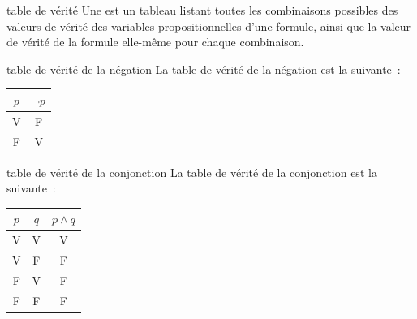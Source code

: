 
\begin{definition}{}{table de vérité}
    Une  est un tableau listant toutes les combinaisons possibles des valeurs de vérité des variables propositionnelles d'une formule, ainsi que la valeur de vérité de la formule elle-même pour chaque combinaison.
\end{definition}

\begin{proposition}{}{table de vérité de la négation}
    La table de vérité de la négation est la suivante~:
    \begin{center}
        \begin{tabular}{c|c}
            $p$ & $\neg p$ \\
            \hline
            V & F \\
            F & V \\
        \end{tabular}
    \end{center}
\end{proposition}

\begin{proposition}{}{table de vérité de la conjonction}
    La table de vérité de la conjonction est la suivante~:
    \begin{center}
        \begin{tabular}{c|c|c}
            $p$ & $q$ & $p \land q$ \\
            \hline
            V & V & V \\
            V & F & F \\
            F & V & F \\
            F & F & F \\
        \end{tabular}
    \end{center}
\end{proposition}

